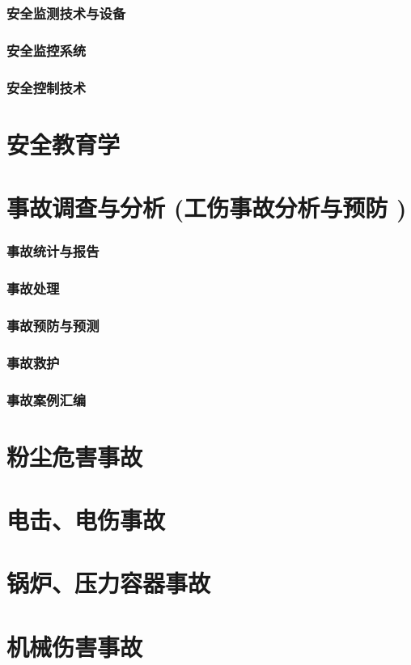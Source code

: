 \documentclass[UTF8]{../ApplicationUniverse}
\begin{document}
    \subsubsection{安全监测技术与设备}
    \subsubsection{安全监控系统}
    \subsubsection{安全控制技术}
\section{安全教育学}
\section{事故调查与分析 (工伤事故分析与预防 )}
    \subsubsection{事故统计与报告}
    \subsubsection{事故处理}
    \subsubsection{事故预防与预测}
    \subsubsection{事故救护}
    \subsubsection{事故案例汇编}
\section{粉尘危害事故}
\section{电击、电伤事故}
\section{锅炉、压力容器事故}
\section{机械伤害事故}
\end{document}
